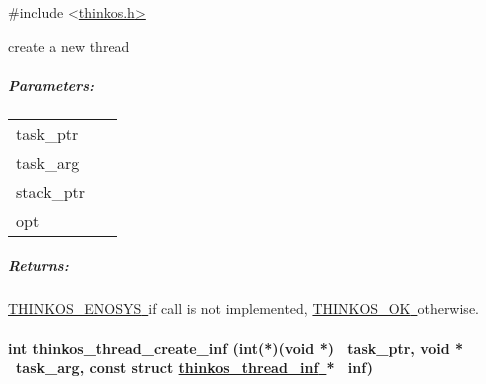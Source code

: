 {\#include
\textless{}}{\protect\hyperlink{h.pkwqa1}{thinkos.h}}{\protect\hyperlink{h.pkwqa1}{\textgreater{}}}

{create a new thread }

{}

\subparagraph{\texorpdfstring{{Parameters:}}{Parameters:}}\label{parameters}

\protect\hypertarget{t.f5730ae642f88aa6ce2571176ce1f624cbde4ea6}{}{}\protect\hypertarget{t.0}{}{}

\begin{longtable}[]{@{}ll@{}}
\toprule
\begin{minipage}[t]{0.47\columnwidth}\raggedright\strut
{task\_ptr}{~}\strut
\end{minipage} & \begin{minipage}[t]{0.47\columnwidth}\raggedright\strut
{}\strut
\end{minipage}\tabularnewline
\begin{minipage}[t]{0.47\columnwidth}\raggedright\strut
{task\_arg}{~}\strut
\end{minipage} & \begin{minipage}[t]{0.47\columnwidth}\raggedright\strut
{}\strut
\end{minipage}\tabularnewline
\begin{minipage}[t]{0.47\columnwidth}\raggedright\strut
{stack\_ptr}{~}\strut
\end{minipage} & \begin{minipage}[t]{0.47\columnwidth}\raggedright\strut
{}\strut
\end{minipage}\tabularnewline
\begin{minipage}[t]{0.47\columnwidth}\raggedright\strut
{opt}{~}\strut
\end{minipage} & \begin{minipage}[t]{0.47\columnwidth}\raggedright\strut
{}\strut
\end{minipage}\tabularnewline
\bottomrule
\end{longtable}

\subparagraph{\texorpdfstring{{Returns:}}{Returns:}}\label{returns}

{\protect\hyperlink{h.3s49zyc}{THINKOS\_ENOSYS}}{\protect\hyperlink{h.3s49zyc}{~}}{if
call is not implemented,
}{\protect\hyperlink{h.2fk6b3p}{THINKOS\_OK}}{\protect\hyperlink{h.2fk6b3p}{~}}{otherwise.
}

\paragraph{\texorpdfstring{{int thinkos\_thread\_create\_inf
(int(*)(void *) ~task\_ptr, void * ~task\_arg, const struct
}{\protect\hyperlink{h.2iq8gzs}{thinkos\_thread\_inf}}{\protect\hyperlink{h.2iq8gzs}{~}}{*
~inf)}}{int thinkos\_thread\_create\_inf (int(*)(void *) ~task\_ptr, void * ~task\_arg, const struct thinkos\_thread\_inf~* ~inf)}}\label{int-thinkos_thread_create_inf-intvoid-task_ptr-void-task_arg-const-struct-thinkos_thread_inf-inf}

